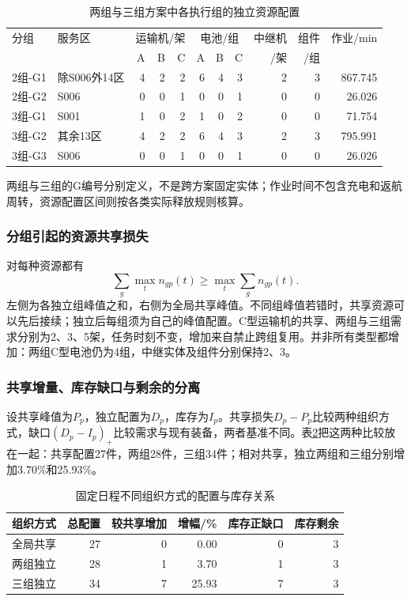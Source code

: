 \documentclass[withoutpreface,colorprint]{format}
\numberwithin{equation}{section}
\numberwithin{figure}{section}
\numberwithin{table}{section}
\begin{document}
\begin{table}[htbp]\centering\small\setlength{\tabcolsep}{4pt}
\caption{两组与三组方案中各执行组的独立资源配置}\label{tab:q4_each_group}
\begin{tabular}{llrrrrrrrrr}\toprule
分组 & 服务区 & \multicolumn{3}{c}{运输机/架} & \multicolumn{3}{c}{电池/组} & 中继机 & 组件 & 作业/min\\
 & & A & B & C & A & B & C & /架 & /组 & \\\midrule
2组-G1 & 除S006外14区 & 4 & 2 & 2 & 6 & 4 & 3 & 2 & 3 & 867.745\\
2组-G2 & S006 & 0 & 0 & 1 & 0 & 0 & 1 & 0 & 0 & 26.026\\
3组-G1 & S001 & 1 & 0 & 2 & 1 & 0 & 2 & 0 & 0 & 71.754\\
3组-G2 & 其余13区 & 4 & 2 & 2 & 6 & 4 & 3 & 2 & 3 & 795.991\\
3组-G3 & S006 & 0 & 0 & 1 & 0 & 0 & 1 & 0 & 0 & 26.026\\
\bottomrule\end{tabular}
\par\smallskip\footnotesize 两组与三组的G编号分别定义，不是跨方案固定实体；作业时间不包含充电和返航周转，资源配置区间则按各类实际释放规则核算。
\end{table}


\subsubsection{分组引起的资源共享损失}
对每种资源都有
\begin{equation}
 \sum_g\max_t n_{gp}(t)\ge\max_t\sum_gn_{gp}(t).
\label{eq:q4_pooling}
\end{equation}
左侧为各独立组峰值之和，右侧为全局共享峰值。不同组峰值若错时，共享资源可以先后接续；独立后每组须为自己的峰值配置。C型运输机的共享、两组与三组需求分别为2、3、5架，任务时刻不变，增加来自禁止跨组复用。并非所有类型都增加：两组C型电池仍为4组，中继实体及组件分别保持2、3。


\subsubsection{共享增量、库存缺口与剩余的分离}
设共享峰值为$P_p$，独立配置为$D_p$，库存为$I_p$。共享损失$D_p-P_p$比较两种组织方式，缺口$(D_p-I_p)_+$比较需求与现有装备，两者基准不同。表\ref{tab:rev_q4_organization}把这两种比较放在一起：共享配置27件，两组28件，三组34件；相对共享，独立两组和三组分别增加3.70\%和25.93\%。

\begin{table}[htbp]\centering\small
\caption{固定日程不同组织方式的配置与库存关系}\label{tab:rev_q4_organization}
\begin{tabular}{lrrrrr}\toprule
组织方式 & 总配置 & 较共享增加 & 增幅/\% & 库存正缺口 & 库存剩余\\\midrule
全局共享 & 27 & 0 & 0.00 & 0 & 3\\
两组独立 & 28 & 1 & 3.70 & 1 & 3\\
三组独立 & 34 & 7 & 25.93 & 7 & 3\\
\bottomrule\end{tabular}
\end{table}
\end{document}
